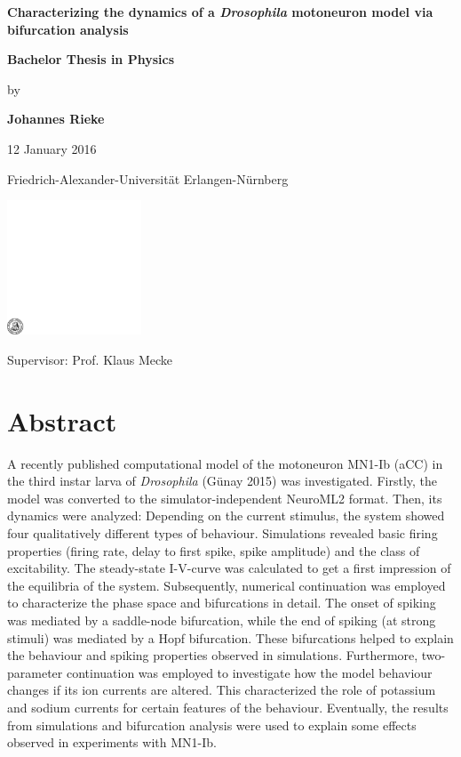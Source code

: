 \documentclass[12pt,a4paper,]{report}
\date{}
\begin{document}
\begin{titlepage}

\centering\large
\vspace*{1.5cm}

{\LARGE\bf Characterizing the dynamics of a \textit{Drosophila} motoneuron model via bifurcation analysis}

\vspace{1.5cm}

\textbf{Bachelor Thesis in Physics}

by

\textbf{Johannes Rieke}

12 January 2016

\vspace{1.5cm}

Friedrich-Alexander-Universität Erlangen-Nürnberg

\vspace{1.5cm}
\includegraphics[width=0.3\textwidth]{images/fau-siegel.pdf}\par
\vspace{1.5cm}

Supervisor: Prof. Klaus Mecke

\end{titlepage}

\chapter*{Abstract}\label{abstract}

A recently published computational model of the motoneuron MN1-Ib (aCC)
in the third instar larva of \emph{Drosophila} (Günay 2015) was
investigated. Firstly, the model was converted to the
simulator-independent NeuroML2 format. Then, its dynamics were analyzed:
Depending on the current stimulus, the system showed four qualitatively
different types of behaviour. Simulations revealed basic firing
properties (firing rate, delay to first spike, spike amplitude) and the
class of excitability. The steady-state I-V-curve was calculated to get
a first impression of the equilibria of the system. Subsequently,
numerical continuation was employed to characterize the phase space and
bifurcations in detail. The onset of spiking was mediated by a
saddle-node bifurcation, while the end of spiking (at strong stimuli)
was mediated by a Hopf bifurcation. These bifurcations helped to explain
the behaviour and spiking properties observed in simulations.
Furthermore, two-parameter continuation was employed to investigate how
the model behaviour changes if its ion currents are altered. This
characterized the role of potassium and sodium currents for certain
features of the behaviour. Eventually, the results from simulations and
bifurcation analysis were used to explain some effects observed in
experiments with MN1-Ib.
\end{document}

